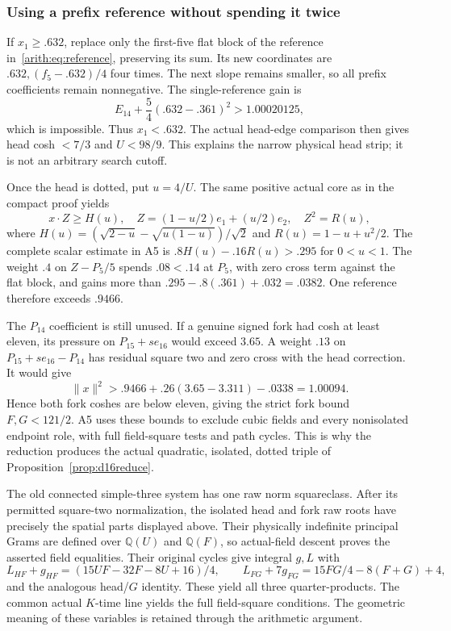 \documentclass[11pt]{article}
\theoremstyle{remark}\newtheorem{remark}[theorem]{Remark}
\numberwithin{equation}{section}
\newcommand{\Q}{\mathbb Q}
\newcommand{\norm}[1]{\lVert #1\rVert}
\begin{document}
\subsubsection{Using a prefix reference without spending it twice}
If $x_1\ge.632$, replace only the first-five flat block of the reference
in~\eqref{arith:eq:reference}, preserving its sum. Its new coordinates are
$.632,(f_5-.632)/4$ four times. The next slope remains smaller, so all
prefix coefficients remain nonnegative. The single-reference gain is
\[
 E_{14}+\frac54(.632-.361)^2>1.00020125,
\]
which is impossible. Thus $x_1<.632$. The actual head-edge comparison
then gives head cosh $<7/3$ and $U<98/9$. This explains the narrow
physical head strip; it is not an arbitrary search cutoff.

Once the head is dotted, put $u=4/U$. The same positive actual core as
in the compact proof yields
\[
 x\cdot Z\ge H(u),\quad Z=(1-u/2)e_1+(u/2)e_2,
 \quad Z^2=R(u),
\]
where $H(u)=(\sqrt{2-u}-\sqrt{u(1-u)})/\sqrt2$ and
$R(u)=1-u+u^2/2$. The complete scalar estimate in A5 is
$.8H(u)-.16R(u)>.295$ for $0<u<1$.
The weight $.4$ on $Z-P_5/5$ spends $.08<.14$ at $P_5$,
with zero cross term against the flat block, and gains more than
$.295-.8(.361)+.032=.0382$. One reference therefore exceeds $.9466$.

The $P_{14}$ coefficient is still unused. If a genuine signed fork had
cosh at least eleven, its pressure on $P_{15}+s e_{16}$ would exceed
$3.65$. A weight $.13$ on $P_{15}+s e_{16}-P_{14}$ has residual
square two and zero cross with the head correction. It would give
\[
 \norm{x}^2>.9466+.26(3.65-3.311)-.0338=1.00094.
\]
Hence both fork coshes are below eleven, giving the strict fork bound
$F,G<121/2$. A5 uses these bounds to exclude cubic fields and every
nonisolated endpoint role, with full field-square tests and path cycles.
This is why the reduction produces the actual quadratic, isolated,
dotted triple of Proposition~\ref{prop:d16reduce}.

The old connected simple-three system has one raw norm squareclass.
After its permitted square-two normalization, the isolated head and fork
raw roots have precisely the spatial parts displayed above. Their
physically indefinite principal Grams are defined over $\Q(U)$ and
$\Q(F)$, so actual-field descent proves the asserted field equalities.
Their original cycles give integral $g,L$ with
\[
 L_{HF}+g_{HF}=(15UF-32F-8U+16)/4,
 \qquad L_{FG}+7g_{FG}=15FG/4-8(F+G)+4,
\]
and the analogous head/$G$ identity. These yield all three
quarter-products. The common actual $K$-time line yields the full
field-square conditions. The geometric meaning of these variables
is retained through the arithmetic argument.
\end{document}
